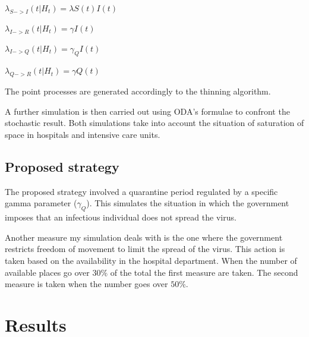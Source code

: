 \documentclass[conference]{IEEEtran}
\begin{document}
\begin{center}
    \begin{math}
        \lambda_{S->I}(t|H_t) = \lambda S(t) I(t)
    \end{math}
\end{center}

\begin{center}
    \begin{math}
        \lambda_{I->R}(t|H_t) = \gamma I(t)
    \end{math}    
\end{center}

\begin{center}
    \begin{math}
        \lambda_{I->Q}(t|H_t) = \gamma_Q I(t)
    \end{math}    
\end{center}

\begin{center}
    \begin{math}
        \lambda_{Q->R}(t|H_t) = \gamma Q(t)
    \end{math}    
\end{center}

The point processes are generated accordingly to the thinning algorithm.

A further simulation is then carried out using ODA's formulae to confront the stochastic result.
%
Both simulations take into account the situation of saturation of space in hospitals and intensive care units.

\subsection{Proposed strategy}

The proposed strategy involved a quarantine period regulated by a specific gamma parameter ($\gamma_Q$).
%
This simulates the situation in which the government imposes that an infectious individual does not spread the virus.

Another measure my simulation deals with is the one where the government restricts freedom of movement to limit the spread of the virus. 
%
This action is taken based on the availability in the hospital department.
%
When the number of available places go over $30\%$ of the total the first measure are taken.
%
The second measure is taken when the number goes over $50\%$.
   
\section{Results}
\end{document}
